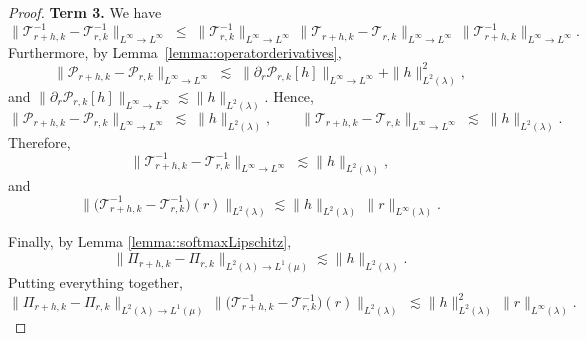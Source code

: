 \documentclass[11pt]{article}
\theoremstyle{plain}
\begin{document}
\begin{proof}
\medskip
\noindent \textbf{Term 3.}
We have
\[
\|\mathcal{T}_{r+h,k}^{-1} - \mathcal{T}_{r,k}^{-1}\|_{L^\infty \to L^\infty}
\;\le\; \|\mathcal{T}_{r,k}^{-1}\|_{L^\infty \to L^\infty}\,
        \|\mathcal{T}_{r+h,k} - \mathcal{T}_{r,k}\|_{L^\infty \to L^\infty}\,
        \|\mathcal{T}_{r+h,k}^{-1}\|_{L^\infty \to L^\infty}.
\]
Furthermore, by Lemma~\ref{lemma::operatorderivatives},
\[
\big\| \mathcal{P}_{r + h, k}  - \mathcal{P}_{r, k} \big\|_{L^\infty \to L^\infty}   
     \;\lesssim\; \|\partial_r \mathcal{P}_{r, k}[h]\|_{L^\infty \to L^\infty} 
     + \|h\|_{L^2(\lambda)}^2,
\]
and $\|\partial_r \mathcal{P}_{r, k}[h]\|_{L^\infty \to L^\infty} \lesssim \|h\|_{L^2(\lambda)}$. Hence,
\[
\|\mathcal{P}_{r+h,k} - \mathcal{P}_{r,k}\|_{L^\infty \to L^\infty}
\;\lesssim\; \|h\|_{L^2(\lambda)}, 
\qquad
\|\mathcal{T}_{r+h,k} - \mathcal{T}_{r,k}\|_{L^\infty \to L^\infty}
\;\lesssim\; \|h\|_{L^2(\lambda)}.
\]
Therefore,
\[
\|\mathcal{T}_{r+h,k}^{-1} - \mathcal{T}_{r,k}^{-1}\|_{L^\infty \to L^\infty} 
\;\lesssim \|h\|_{L^2(\lambda)},
\]
and
\[
\big\|\big(\mathcal{T}_{r+h,k}^{-1}-\mathcal{T}_{r,k}^{-1}\big)(r)\big\|_{L^2(\lambda)} 
\lesssim \|h\|_{L^2(\lambda)} \,\|r\|_{L^\infty(\lambda)}.
\]

Finally, by Lemma \ref{lemma::softmaxLipschitz},
\[
\big\|\Pi_{r+h,k}-\Pi_{r,k}\big\|_{L^2(\lambda) \to L^1(\mu)} \lesssim \|h\|_{L^2(\lambda)}.
\]
Putting everything together,
\[
\big\|\Pi_{r+h,k}-\Pi_{r,k}\big\|_{L^2(\lambda) \to L^1(\mu)} 
\,\big\|\big(\mathcal{T}_{r+h,k}^{-1}-\mathcal{T}_{r,k}^{-1}\big)(r)\big\|_{L^2(\lambda)} 
\;\lesssim \|h\|_{L^2(\lambda)}^2 \,\|r\|_{L^\infty(\lambda)}.
\]



\end{proof}
\end{document}

